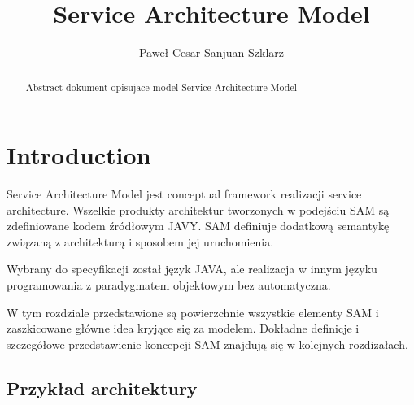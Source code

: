 \documentclass[a4paper,10pt]{article}
\title{Service Architecture Model}
\author{Paweł Cesar Sanjuan Szklarz}
\begin{document}
\maketitle

\begin{abstract}
Abstract
dokument opisujace model Service Architecture Model
\end{abstract}

\section{Introduction}


Service Architecture Model jest conceptual framework realizacji service architecture. Wszelkie produkty architektur tworzonych w podejściu SAM są zdefiniowane kodem źródłowym JAVY. SAM definiuje dodatkową semantykę związaną z architekturą i sposobem jej uruchomienia. 

Wybrany do specyfikacji został język JAVA, ale realizacja w innym języku programowania z paradygmatem objektowym bez automatyczna.

W tym rozdziale przedstawione są powierzchnie wszystkie elementy SAM i zaszkicowane główne idea kryjące się za modelem. Dokładne definicje i szczegółowe przedstawienie koncepcji SAM znajdują się w kolejnych rozdizałach.




\subsection{Przykład architektury}

% 
% 
% 
% 
% 
% 
% 
% 
% 
% 
% 
\end{document}
